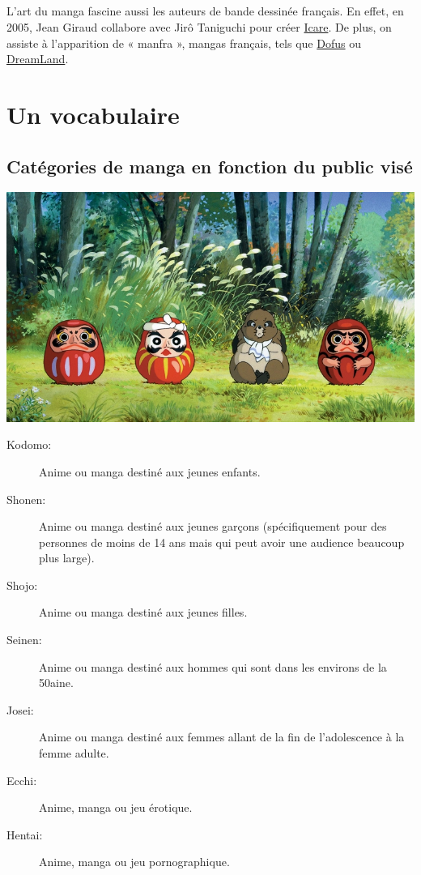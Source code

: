 \paragraph{}
L’art du manga fascine aussi les auteurs de bande dessinée français. En effet, en 2005, Jean Giraud collabore avec Jirô Taniguchi pour créer \underline{Icare}. De plus, on assiste à l’apparition de « manfra », mangas français, tels que \underline{Dofus} ou \underline{DreamLand}.

\chapter{Un vocabulaire}

\section{Catégories de manga en fonction du public visé}

\begin{center}
	\includegraphics[scale=0.5]{Kodomo.jpg}
\end{center}

\begin{description}
	\item[Kodomo:] Anime ou manga destiné aux jeunes enfants.
	\item[Shonen:] Anime ou manga destiné aux jeunes garçons (spécifiquement
		pour des personnes de moins de 14 ans mais qui peut avoir une audience
		beaucoup plus large).
	\item[Shojo:] Anime ou manga destiné aux jeunes filles.
	\item[Seinen:] Anime ou manga destiné aux hommes qui sont dans les environs
		de la 50aine.
	\item[Josei:] Anime ou manga destiné aux femmes allant de la fin de
		l'adolescence à la femme adulte.
	\item[Ecchi:] Anime, manga ou jeu érotique.
	\item[Hentai:] Anime, manga ou jeu pornographique.
\end{description}

